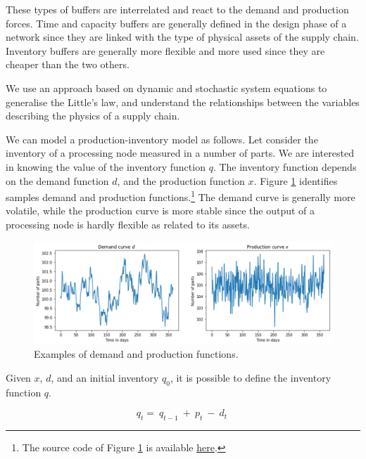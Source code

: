 These types of buffers are interrelated and react to the demand and production forces. Time and capacity buffers are generally defined in the design phase of a network since they are linked with the type of physical assets of the supply chain. Inventory buffers are generally more flexible and more used since they are cheaper than the two others. \par

We use an approach based on dynamic and stochastic system equations to generalise the Little’s law, and understand the relationships between the variables describing the physics of a supply chain.\par

We can model a production-inventory model as follows. Let consider the inventory of a processing node measured in a number of parts. We are interested in knowing the value of the inventory function $q$. The inventory function depends on the demand function $d$, and the production function $x$. Figure \ref{fig_demandProduction} identifies samples demand and production functions.\footnote{The source code of Figure \ref{fig_demandProduction} is available \href{https://github.com/aletuf93/logproj/blob/master/examples/Supply\%20chain\%20physics.ipynb}{here}.} The demand curve is generally more volatile, while the production curve is more stable since the output of a processing node is hardly flexible as related to its assets.

\begin{figure}[hbt!]
\centering
\includegraphics[width=1\textwidth]{SectionIntroduction/informationFramework_figures/fig_demandProduction.png}
\captionsetup{type=figure}
\caption{Examples of demand and production functions.}
\label{fig_demandProduction}
\end{figure}

Given $x$, $d$, and an initial inventory $q_0$, it is possible to define the inventory function $q$.

\begin{equation}
q_t=\ q_{t-1}\ +\ p_t\ -\ d_t\ 
\label{eq_physics1}
\end{equation}

